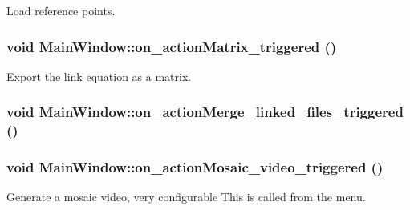 Load reference points. 

\hypertarget{class_main_window_512962db92632ebe41675384cb173c4c}{
\subsubsection[{on\_\-actionMatrix\_\-triggered}]{\setlength{\rightskip}{0pt plus 5cm}void MainWindow::on\_\-actionMatrix\_\-triggered ()}}
\label{class_main_window_512962db92632ebe41675384cb173c4c}


Export the link equation as a matrix. 

\hypertarget{class_main_window_4ee2cbe325b7a9fcd3b63b73b11d8424}{
\subsubsection[{on\_\-actionMerge\_\-linked\_\-files\_\-triggered}]{\setlength{\rightskip}{0pt plus 5cm}void MainWindow::on\_\-actionMerge\_\-linked\_\-files\_\-triggered ()}}
\label{class_main_window_4ee2cbe325b7a9fcd3b63b73b11d8424}


\hypertarget{class_main_window_7d324ac19401d086a1429d0dce635508}{
\subsubsection[{on\_\-actionMosaic\_\-video\_\-triggered}]{\setlength{\rightskip}{0pt plus 5cm}void MainWindow::on\_\-actionMosaic\_\-video\_\-triggered ()}}
\label{class_main_window_7d324ac19401d086a1429d0dce635508}


Generate a mosaic video, very configurable This is called from the menu. 

